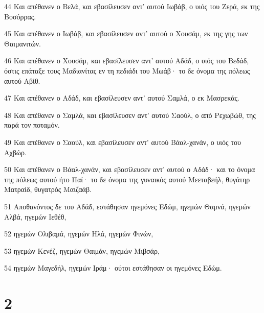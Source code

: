 \par 44 Και απέθανεν ο Βελά, και εβασίλευσεν αντ' αυτού Ιωβάβ, ο υιός του Ζερά, εκ της Βοσόρρας.
\par 45 Και απέθανεν ο Ιωβάβ, και εβασίλευσεν αντ' αυτού ο Χουσάμ, εκ της γης των Θαιμανιτών.
\par 46 Και απέθανεν ο Χουσάμ, και εβασίλευσεν αντ' αυτού Αδάδ, ο υιός του Βεδάδ, όστις επάταξε τους Μαδιανίτας εν τη πεδιάδι του Μωάβ· το δε όνομα της πόλεως αυτού Αβίθ.
\par 47 Και απέθανεν ο Αδάδ, και εβασίλευσεν αντ' αυτού Σαμλά, ο εκ Μασρεκάς.
\par 48 Και απέθανεν ο Σαμλά, και εβασίλευσεν αντ' αυτού Σαούλ, ο από Ρεχωβώθ, της παρά τον ποταμόν.
\par 49 Και απέθανεν ο Σαούλ, και εβασίλευσεν αντ' αυτού Βάαλ-χανάν, ο υιός του Αχβώρ.
\par 50 Και απέθανεν ο Βάαλ-χανάν, και εβασίλευσεν αντ' αυτού ο Αδάδ· και το όνομα της πόλεως αυτού ήτο Παί· το δε όνομα της γυναικός αυτού Μεεταβεήλ, θυγάτηρ Ματραίδ, θυγατρός Μαιζαάβ.
\par 51 Αποθανόντος δε του Αδάδ, εστάθησαν ηγεμόνες Εδώμ, ηγεμών Θαμνά, ηγεμών Αλβά, ηγεμών Ιεθέθ,
\par 52 ηγεμών Ολιβαμά, ηγεμών Ηλά, ηγεμών Φινών,
\par 53 ηγεμών Κενέζ, ηγεμών Θαιμάν, ηγεμών Μιβσάρ,
\par 54 ηγεμών Μαγεδήλ, ηγεμών Ιράμ· ούτοι εστάθησαν οι ηγεμόνες Εδώμ.

\chapter{2}


